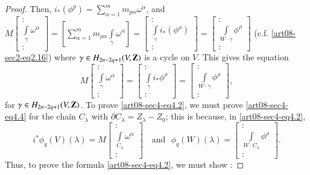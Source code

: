\begin{proof}
Then, $i_{*}(\phi^{p})=\sum\limits^{m}_{\alpha=1}m_{p\alpha}\omega^{\alpha}$, and $M\left[\begin{smallmatrix} :\\ \int\limits_{\gamma}\omega^{\alpha}\\ :\end{smallmatrix}\right]=\left[\sum\limits^{m}_{\alpha=1}m_{\rho\alpha}\int\limits_{\gamma}\omega^{\alpha}\right]=\left[\begin{smallmatrix}:\\ \int\limits_{\gamma}i_{*}(\phi^{\rho})\\ :\end{smallmatrix}\right]=\left[\begin{smallmatrix} :\\ \int\limits_{W\cdot \gamma}\phi^{\rho}\\ :\end{smallmatrix}\right]$ (c.f. \eqref{art08-sec2-eq2.16}) where $\gamma\in H_{2n-2q+1}(V,\mathbf{Z})$ is a cycle on $V$. This gives the equation
\begin{equation*}
M\begin{bmatrix}
:\\
\int\limits_{\gamma}\omega^{\alpha}\\
:
\end{bmatrix}
=
\begin{bmatrix}
:\\
\int\limits_{\gamma}i_{*}\phi^{\rho}\\
:
\end{bmatrix}
=
\begin{bmatrix}
:\\
\int\limits_{W\cdot \gamma} \phi^{\rho}\\
:
\end{bmatrix},\tag{4.4}\label{art08-sec4-eq4.4}
\end{equation*}
for $\gamma\in H_{2n-2q+1}(V,\mathbf{Z})$. To prove \eqref{art08-sec4-eq4.2}, we must prove \eqref{art08-sec4-eq4.4} for the chain $C_{\lambda}$ with $\partial C_{\lambda}=Z_{\lambda}-Z_{0}$; this is because, in \eqref{art08-sec4-eq4.2},
$$
i^{*}\phi_{q}(V)(\lambda)=M
\begin{bmatrix}
:\\
\int\limits_{C_{\lambda}}\omega^{\alpha}\\
:
\end{bmatrix}
\text{~~ and~~} \phi_{q}(W)(\lambda)=
\begin{bmatrix}
:\\
\int\limits_{W\cdot C_{\lambda}}\phi^{\rho}\\
:
\end{bmatrix}.
$$
Thus, to prove the formula \eqref{art08-sec4-eq4.2}, we must show :


\end{proof}

